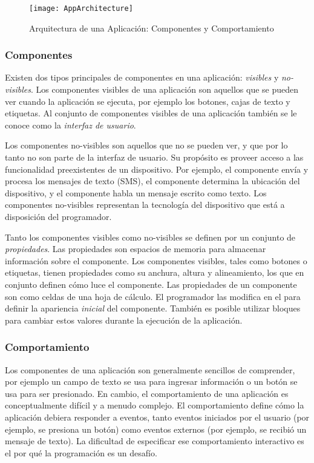 \begin{figure}[H]
  \centering
  \texttt{[image: AppArchitecture]}
  \caption{Arquitectura de una Aplicación: Componentes y Comportamiento}
  \label{fig:appArchitecture}
\end{figure}

\subsubsection*{Componentes}

Existen dos tipos principales de componentes en una aplicación: \emph{visibles} y \emph{no-visibles}. Los componentes visibles de una aplicación son aquellos que se pueden ver cuando la aplicación se ejecuta, por ejemplo los botones, cajas de texto y etiquetas. Al conjunto de componentes visibles de una aplicación también se le conoce como la \emph{interfaz de usuario}.

Los componentes no-visibles son aquellos que no se pueden ver, y que por lo tanto no son parte de la interfaz de usuario. Su propósito es proveer acceso a las funcionalidad preexistentes de un dispositivo. Por ejemplo, el componente  envía y procesa los mensajes de texto (SMS), el componente  determina la ubicación del dispositivo, y el componente  habla un mensaje escrito como texto. Los componentes no-visibles representan la tecnología del dispositivo que está a disposición del programador.

Tanto los componentes visibles como no-visibles se definen por un conjunto de \emph{propiedades}. Las propiedades son espacios de memoria para almacenar información sobre el componente. Los componentes visibles, tales como botones o etiquetas, tienen propiedades como su anchura, altura y alineamiento, los que en conjunto definen cómo luce el componente.
%
Las propiedades de un componente son como celdas de una hoja de cálculo. El programador las modifica en el \componentDesigner para definir la apariencia \emph{inicial} del componente. También es posible utilizar bloques para cambiar estos valores durante la ejecución de la aplicación.

\subsubsection*{Comportamiento}

Los componentes de una aplicación son generalmente sencillos de comprender, por ejemplo un campo de texto se usa para ingresar información o un botón se usa para ser presionado. En cambio, el comportamiento de una aplicación es conceptualmente difícil y a menudo complejo. El comportamiento define cómo la aplicación debiera responder a eventos, tanto eventos iniciados por el usuario (por ejemplo, se presiona un botón) como eventos externos (por ejemplo, se recibió un mensaje de texto). La dificultad de especificar ese comportamiento interactivo es el por qué la programación es un desafío.

